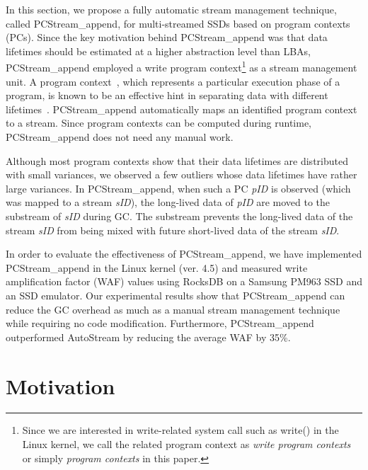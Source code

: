 In this section, we propose a fully automatic stream management technique, called \textsf{\small PCStream\_append}, 
for multi-streamed SSDs based on program contexts (PCs).
Since the key motivation behind \textsf{\small PCStream\_append} was 
that data lifetimes should be estimated at a higher abstraction level than LBAs, 
\textsf{\small PCStream\_append} employed a write program context\footnote{Since we are interested in write-related 
system call such as write() in the Linux kernel, 
we call the related program context as 
{\it write program contexts} or simply {\it program contexts} in this paper.}  
as a stream management unit.
A program context~\cite{PC, PC2}, which represents a particular execution phase of a program, 
is known to be an effective hint in separating data with different lifetimes~\cite{PCHa}.  
\textsf{\small PCStream\_append} automatically maps an identified program context to a stream.  
Since program contexts can be computed during runtime, 
\textsf{\small PCStream\_append} does not need any manual work.   

Although most program contexts show that their data lifetimes are 
distributed with small variances, we observed a few outliers 
whose data lifetimes have rather large variances.
In \textsf{\small PCStream\_append}, 
when such a PC {\it pID} is observed (which was mapped to a stream {\it sID}), 
the long-lived data of {\it pID} are moved to the substream of {\it sID}
during GC.  
The substream prevents the long-lived data of the stream {\it sID} 
from being mixed with future short-lived data of the stream {\it sID}.

In order to evaluate the effectiveness of \textsf{\small PCStream\_append}, 
we have implemented \textsf{\small PCStream\_append}
in the Linux kernel (ver. 4.5) and measured write amplification factor (WAF) values 
using RocksDB on a Samsung PM963 SSD 
and an SSD emulator.
Our experimental results show that \textsf{\small PCStream\_append}
can reduce the GC overhead as much as a %
manual stream management technique while requiring no code modification.  
Furthermore, \textsf{\small PCStream\_append} outperformed \textsf{\small AutoStream} by reducing the average WAF by 35\%.


\section{Motivation}
